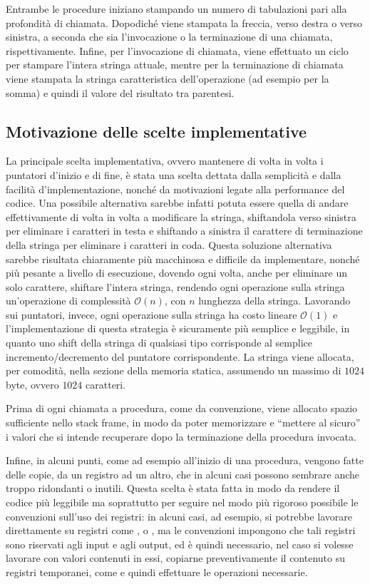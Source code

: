 		Entrambe le procedure iniziano stampando un numero di tabulazioni pari alla profondità di chiamata. Dopodiché viene stampata la freccia, verso destra o verso sinistra, a seconda che sia l'invocazione o la terminazione di una chiamata, rispettivamente. Infine, per l'invocazione di chiamata, viene effettuato un ciclo per stampare l'intera stringa attuale, mentre per la terminazione di chiamata viene stampata la stringa caratteristica dell'operazione (ad esempio  per la somma) e quindi il valore del risultato tra parentesi.
		
	\subsection*{Motivazione delle scelte implementative}
		La principale scelta implementativa, ovvero mantenere di volta in volta i puntatori d'inizio e di fine, è stata una scelta dettata dalla semplicità e dalla facilità d'implementazione, nonché da motivazioni legate alla performance del codice. Una possibile alternativa sarebbe infatti potuta essere quella di andare effettivamente di volta in volta a modificare la stringa, shiftandola verso sinistra per eliminare i caratteri in testa e shiftando a sinistra il carattere di terminazione della stringa per eliminare i caratteri in coda. Questa soluzione alternativa sarebbe risultata chiaramente più macchinosa e difficile da implementare, nonché più pesante a livello di esecuzione, dovendo ogni volta, anche per eliminare un solo carattere, shiftare l'intera stringa, rendendo ogni operazione sulla stringa un'operazione di complessità $\mathcal{O}(n)$, con $n$ lunghezza della stringa. Lavorando sui puntatori, invece, ogni operazione sulla stringa ha costo lineare $\mathcal{O}(1)$ e l'implementazione di questa strategia è sicuramente più semplice e leggibile, in quanto uno shift della stringa di qualsiasi tipo corrisponde al semplice incremento/decremento del puntatore corrispondente. La stringa viene allocata, per comodità, nella sezione della memoria statica, assumendo un massimo di $1024$ byte, ovvero $1024$ caratteri.
		
		Prima di ogni chiamata a procedura, come da convenzione, viene allocato spazio sufficiente nello stack frame, in modo da poter memorizzare e ``mettere al sicuro'' i valori che si intende recuperare dopo la terminazione della procedura invocata.
		
		Infine, in alcuni punti, come ad esempio all'inizio di una procedura, vengono fatte delle copie, da un registro ad un altro, che in alcuni casi possono sembrare anche troppo ridondanti o inutili. Questa scelta è stata fatta in modo da rendere il codice più leggibile ma soprattutto per seguire nel modo più rigoroso possibile le convenzioni sull'uso dei registri: in alcuni casi, ad esempio, si potrebbe lavorare direttamente su registri come ,  o , ma le convenzioni impongono che tali registri sono riservati agli input e agli output, ed è quindi necessario, nel caso si volesse lavorare con valori contenuti in essi, copiarne preventivamente il contenuto su registri temporanei, come  e quindi effettuare le operazioni necessarie.
		
